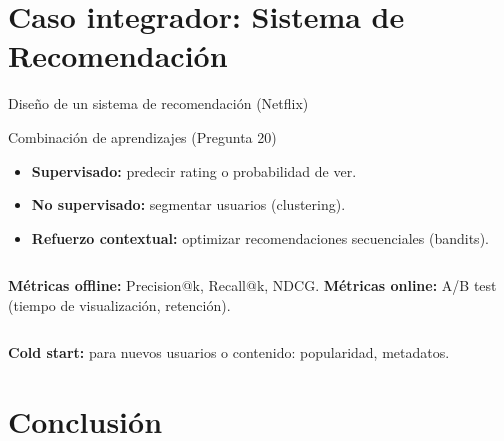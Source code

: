 \documentclass[aspectratio=169, 10pt, xcolor=table]{beamer}
\begin{document}
\section{Caso integrador: Sistema de Recomendación}

\begin{frame}{Diseño de un sistema de recomendación (Netflix)}
    \begin{block}{Combinación de aprendizajes (Pregunta 20)}
        \begin{itemize}
            \item \textbf{Supervisado:} predecir rating o probabilidad de ver.
            \item \textbf{No supervisado:} segmentar usuarios (clustering).
            \item \textbf{Refuerzo contextual:} optimizar recomendaciones secuenciales (bandits).
        \end{itemize}
    \end{block}
    \begin{columns}[t]
        \textbf{Métricas offline:} Precision@k, Recall@k, NDCG.
        \textbf{Métricas online:} A/B test (tiempo de visualización, retención).
    \end{columns}
    \vspace{0.2cm}
    \textbf{Cold start:} para nuevos usuarios o contenido: popularidad, metadatos.
\end{frame}

\section{Conclusión}
\end{document}
